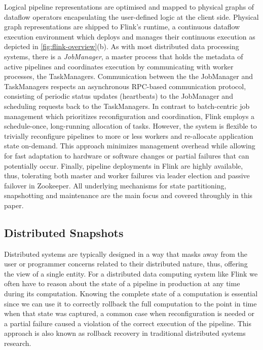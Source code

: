Logical pipeline representations are optimised and mapped to physical graphs of dataflow operators encapsulating the user-defined logic at the client side. Physical graph representations are shipped to Flink's runtime, a continuous dataflow execution environment which deploys and manages their continuous execution as depicted in \autoref{fig:flink-overview}(b). As with most distributed data processing systems, there is a \emph{JobManager}, a master process that holds the metadata of active pipelines and coordinates execution by communicating with worker processes, the TaskManagers. Communication between the the JobManager and TaskManagers respects an asynchronous RPC-based communication protocol, consisting of periodic status updates (heartbeats) to the JobManager and scheduling requests back to the TaskManagers. In contrast to batch-centric job management \cite{zaharia2012discretized,venkataramandrizzle} which prioritizes reconfiguration and coordination, Flink employs a schedule-once, long-running allocation of tasks. However, the system is flexible to trivially reconfigure pipelines to more or less workers and re-allocate application state on-demand. This approach minimizes management overhead while allowing for fast adaptation to hardware or software changes or partial failures that can potentially occur. Finally, pipeline deployments in Flink are highly available, thus, tolerating both master and worker failures via leader election and passive failover in Zookeeper. All underlying mechanisms for state partitioning, snapshotting and maintenance are the main focus and covered throughly in this paper.


\subsection{Distributed Snapshots}

Distributed systems are typically designed in a way that masks away from the user or programmer concerns related to their distributed nature, thus, offering the view of a single entity. For a distributed data computing system like Flink we often have to reason about the state of a pipeline in production at any time during its computation. Knowing the complete state of a computation is essential since we can use it to correctly rollback the full computation to the point in time when that state was captured, a common case when reconfiguration is needed or a partial failure caused a violation of the correct execution of the pipeline. This approach is also known as rollback recovery \cite{elnozahy2002survey} in traditional distributed systems research.

